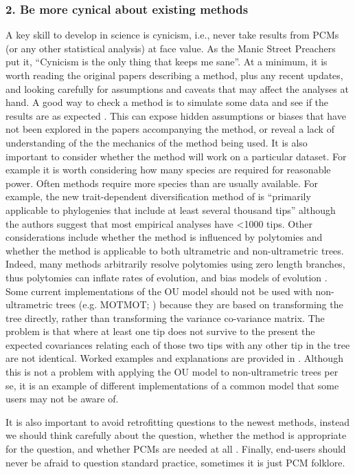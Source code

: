 \documentclass[a4paper,12pt]{article}
\begin{document}
  \subsubsection{2. Be more cynical about existing methods}
    A key skill to develop in science is cynicism, i.e., never take results from PCMs (or any other statistical analysis) at face value.
    As the Manic Street Preachers put it, ``Cynicism is the only thing that keeps me sane''.
    At a minimum, it is worth reading the original papers describing a method, plus any recent updates, and looking carefully for assumptions and caveats that may affect the analyses at hand.
    A good way to check a method is to simulate some data and see if the results are as expected \citep[e.g.][]{boettiger2012your}. 
    This can expose hidden assumptions or biases that have not been explored in the papers accompanying the method, or reveal a lack of understanding of the the mechanics of the method being used. 
    It is also important to consider whether the method will work on a particular dataset.
    For example it is worth considering how many species are required for reasonable power. 
    Often methods require more species than are usually  available. For example, the new trait-dependent diversification method of \citet{rabosky2015robust} is ``primarily applicable to phylogenies that include at least several thousand tips'' although the authors suggest that most empirical analyses have \textless 1000 tips. 
    Other considerations include whether the method is influenced by polytomies and whether the method is applicable to both ultrametric and non-ultrametric trees. 
    Indeed, many methods arbitrarily resolve polytomies using zero length branches, thus polytomies can inflate rates of evolution, and bias models of evolution  \citep{cooper2010body}. 
    Some current implementations of the OU model should not be used with non-ultrametric trees (e.g. MOTMOT; \citealp{Thomas:2011aa}) because they are based on transforming the tree directly, rather than transforming the variance co-variance matrix. The problem is that where at least one tip does not survive to the present the expected covariances relating each of those two tips with any other tip in the tree are not identical. Worked examples and explanations are provided in \citep{slater2014correction}. Although this is not a problem with applying the OU model to non-ultrametric trees per se, it is an example of different implementations of a common model that some users may not be aware of. 


    It is also important to avoid retrofitting questions to the newest methods, instead we should think carefully about the question, whether the method is appropriate for the question, and whether PCMs are needed at all \citep{westoby1995misinterpreting,losos2011seeing}.
    Finally, end-users should never be afraid to question standard practice, sometimes it is just PCM folklore.
\end{document}
